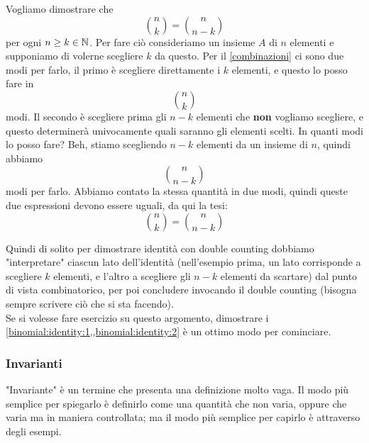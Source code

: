 \documentclass[11pt]{scrartcl}
\begin{document}
	\begin{example}
		Vogliamo dimostrare che $$\binom{n}{k}=\binom{n}{n-k}$$ per ogni $n\ge k \in \mathbb N$. Per fare ciò consideriamo un insieme $A$ di $n$ elementi e supponiamo di volerne scegliere $k$ da questo. Per il \cref{combinazioni} ci sono due modi per farlo, il primo è scegliere direttamente i $k$ elementi, e questo lo posso fare in
		$$\binom{n}{k}$$
		modi. Il secondo è scegliere prima gli $n-k$ elementi che \textbf{non} vogliamo scegliere, e questo determinerà univocamente quali saranno gli elementi scelti. In quanti modi lo posso fare? Beh, stiamo scegliendo $n-k$ elementi da un insieme di $n$, quindi abbiamo
		$$\binom{n}{n-k}$$
		modi per farlo. Abbiamo contato la stessa quantità in due modi, quindi queste due espressioni devono essere uguali, da qui la tesi:
		$$\binom{n}{k}=\binom{n}{n-k}$$
	\end{example}
	Quindi di solito per dimostrare identità con double counting dobbiamo "interpretare" ciascun lato dell'identità (nell'esempio prima, un lato corrisponde a scegliere $k$ elementi, e l'altro a scegliere gli $n-k$ elementi da scartare) dal punto di vista combinatorico, per poi concludere invocando il double counting (bisogna sempre scrivere ciò che si sta facendo). \\
	Se si volesse fare esercizio su questo argomento, dimostrare i \cref{binomial:identity:1,,binomial:identity:2} è un ottimo modo per cominciare.
	
	\subsubsection{Invarianti}
	"Invariante" è un termine che presenta una definizione molto vaga. Il modo più semplice per spiegarlo è definirlo come una quantità che non varia, oppure che varia ma in maniera controllata; ma il modo più semplice per capirlo è attraverso degli esempi.
	
\end{document}
